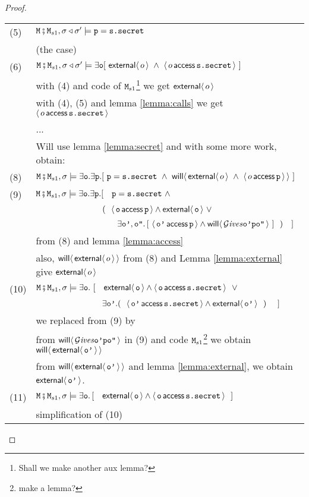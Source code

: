 \documentclass[acmsmall,screen,anonymous,review]{acmart}
\newcommand{\SPACE}{\hspace{1.5in}}
\begin{document}
\begin{proof}
\begin{tabular}{ll}
(5) &  $\M\mkpair \M_{s1}, \sigma\triangleleft \sigma' \models  \prg{p}=\prg{s.secret}$\\
& \SPACE (the case)
\\
(6) & $ \M\mkpair \M_{s1}, \sigma\triangleleft \sigma' \models  \exists \prg{o}[
\ \External{o} \ \wedge \ {\CanAccess {o} {\prg{s.secret}}} \  ]$\\
&  \SPACE with (4) and   code of $\M_{s1}$\footnote{Shall we make another aux lemma?} we get $\External{o}$  \\
&  \SPACE with (4), (5)  and lemma \ref{lemma:calls} we get $ {\CanAccess {o} {\prg{s.secret}}}$    \\
& ...\\
& Will   use lemma \ref{lemma:secret} and with some more work, obtain:\\
(8) &  $ \M\mkpair \M_{s1}, \sigma  \models  \exists \prg{o}.\exists \prg{p}. [\  \prg{p}=\prg{s.secret}\ \wedge\ 
{  \Future {\External{o}  \ \wedge \ {\CanAccess {o} {\prg{p}}  }}} \  ]$\\
(9) & $ \M\mkpair \M_{s1}, \sigma  \models  \exists \prg{o}.\exists \prg{p}. [\  \ \ \prg{p}=\prg{s.secret}\ \wedge\  $\\
& $\strut \hspace{1.1in}  (\ \ {\CanAccess {\prg{o}} {\prg{p}}} \wedge {\External{\prg{o}}} \ \vee $\\
& $\strut \hspace{1.35in} \exists {\prg{o'}},{\prg{o''}}.\,[\  {\CanAccess {\prg{o'}} {\prg{p}}} \wedge
 {\Future{\Gives {\prg{o'}}{\prg{p}} {\prg{o''}} } }   \ ] \ \ )\ \ \ ]$\\
 & \SPACE from (8) and lemma \ref{lemma:access}\\
  & \SPACE also, ${\Future {\External{o}}}$ from (8)  and Lemma \ref{lemma:external} give $\External{o}$\\
(10) & $ \M\mkpair \M_{s1}, \sigma  \models  \exists \prg{o}.\  [\  \ \ \External{\prg{o}} \wedge {\CanAccess {\prg{o}} {\prg{s.secret}} }\ \ \vee $   \\
& $\strut \hspace{1.1in}  \exists {\prg{o'}}.(\   \ {\CanAccess {\prg{o'}} {\prg{s.secret}}} \wedge
\External {\prg{o'}} \ \ ) \ \ \ \ ]$\\
  & \SPACE we replaced \prg{p} from (9) by \prg{s.secret}\\
 & \SPACE from  ${\Future{\Gives {\prg{o'}}{\prg{p}} {\prg{o''}} }}$ in (9) and code $\M_{s1}$\footnote{make a lemma?}
 we obtain ${\Future{\External{\prg{o'}}}}$\\
  & \SPACE from  ${\Future{\External{\prg{o'}}}}$ and lemma \ref{lemma:external}, we obtain $\External{\prg{o'}}$.\\
(11) & $ \M\mkpair \M_{s1}, \sigma  \models  \exists \prg{o}.\,  [\  \ \ \External{\prg{o}} \wedge {\CanAccess {\prg{o}} {\prg{s.secret}} } \ \ ]$\\
& \SPACE simplification of (10)
\end{tabular}




\end{proof}
\end{document}
